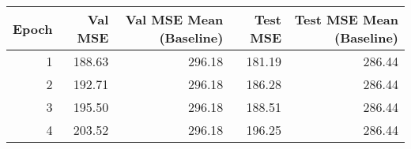 \begin{tabular}{rrrrr}
\toprule
 Epoch &  Val MSE &  Val MSE Mean (Baseline) &  Test MSE &  Test MSE Mean (Baseline) \\
\midrule
     1 &   188.63 &                   296.18 &    181.19 &                    286.44 \\
     2 &   192.71 &                   296.18 &    186.28 &                    286.44 \\
     3 &   195.50 &                   296.18 &    188.51 &                    286.44 \\
     4 &   203.52 &                   296.18 &    196.25 &                    286.44 \\
\bottomrule
\end{tabular}

